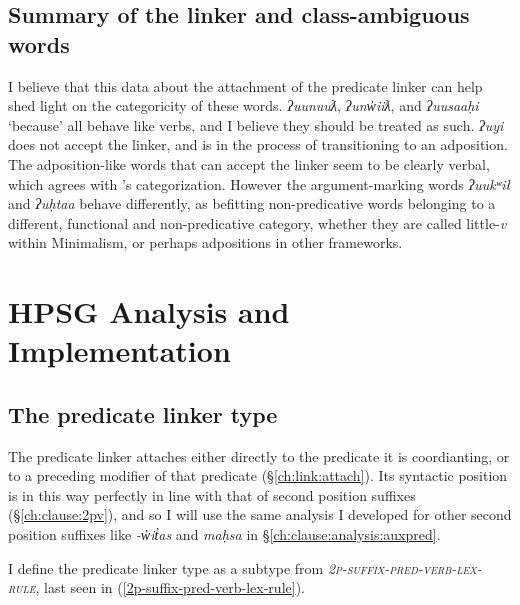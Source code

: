 \subsection{Summary of the linker and class-ambiguous words}

I believe that this data about the attachment of the predicate linker can help shed light on the categoricity of these words. \textit{ʔuunuuƛ}, \textit{ʔunw̓iiƛ}, and \textit{ʔuusaaḥi} `because' all behave like verbs, and I believe they should be treated as such. \textit{ʔuyi} does not accept the linker, and is in the process of transitioning to an adposition. The adposition-like words that can accept the linker seem to be clearly verbal, which agrees with \cite{woo2007b}'s categorization. However the argument-marking words \textit{ʔuukʷił} and \textit{ʔuḥtaa} behave differently, as befitting non-predicative words belonging to a different, functional and non-predicative category, whether they are called little-\textit{v} within Minimalism, or perhaps adpositions in other frameworks.

\section{HPSG Analysis and Implementation} \label{ch:link:analysis}

\subsection{The predicate linker type}

The predicate linker attaches either directly to the predicate it is coordianting, or to a preceding modifier of that predicate (\S\ref{ch:link:attach}). Its syntactic position is in this way perfectly in line with that of second position suffixes (\S\ref{ch:clause:2pv}), and so I will use the same analysis I developed for other second position suffixes like \textit{-w̓it̓as} and \textit{maḥsa} in \S\ref{ch:clause:analysis:auxpred}.

I define the predicate linker type as a subtype from \textsc{\textit{2p-suffix-pred-verb-lex-rule}}, last seen in (\ref{2p-suffix-pred-verb-lex-rule}).


